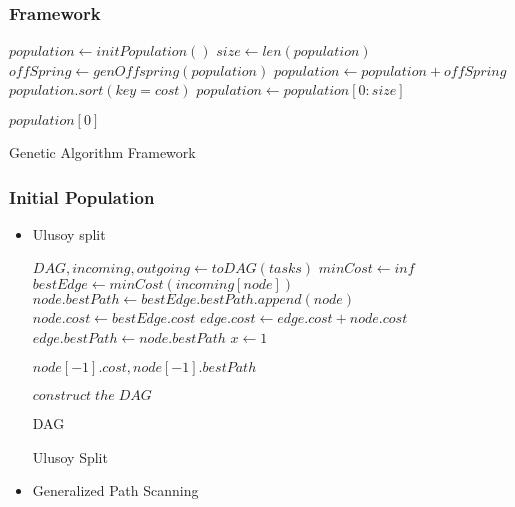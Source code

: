 \documentclass[conference]{IEEEtran}
\begin{document}
    \subsubsection{Framework}
    \begin{algorithm}[H]
        \begin{algorithmic}[1]
            \State $population \gets initPopulation()$
            \State $size \gets len(population)$
                \State $offSpring \gets genOffspring(population)$
                \State $population \gets population + offSpring$
                \State $population.sort(key = cost)$
                \State $population \gets population[0:size]$
            \EndWhile
            
            \Return $population[0]$

        
        \end{algorithmic}
        \caption{Genetic Algorithm Framework}
    \end{algorithm}
    \subsubsection{Initial Population}
    
    
        \begin{itemize}
            \item Ulusoy split

            \begin{algorithm}[H]
            \begin{algorithmic}[1]
                \State $DAG, incoming, outgoing \gets toDAG(tasks)$
                \State $minCost \gets inf$
                \State $bestEdge \gets minCost(incoming[node])$
                \State $node.bestPath \gets bestEdge.bestPath.append(node)$
                \State $node.cost \gets bestEdge.cost$
                    \State $edge.cost \gets edge.cost+node.cost$
                    \State $edge.bestPath \gets node.bestPath$
                \EndFor
                \EndFor
                \State $x \gets 1$
                
                \Return $node[-1].cost, node[-1].bestPath$
                \EndFunction

                \State $construct\; the\; DAG$
                
                \Return DAG
                \EndFunction
            \end{algorithmic}
            \caption{Ulusoy Split}
            \end{algorithm}
            \item Generalized Path Scanning
            
            
        \end{itemize}
\end{document}

